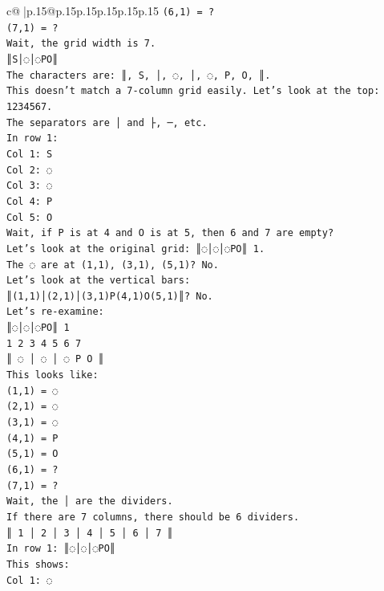 \documentclass{article}
\begin{document}
{\begin{supertabular}{c@{$\;$}|p{.15\linewidth}@{}p{.15\linewidth}p{.15\linewidth}p{.15\linewidth}p{.15\linewidth}p{.15\linewidth}}
{{{\texttt{(6,1) = ?} \\
\texttt{(7,1) = ?} \\
\texttt{Wait, the grid width is 7.} \\
\texttt{║S│◌│◌PO║} \\
\texttt{The characters are: ║, S, │, ◌, │, ◌, P, O, ║.} \\
\texttt{This doesn't match a 7{-}column grid easily. Let's look at the top: 1234567.} \\
\texttt{The separators are │ and ├, ─, etc.} \\
\texttt{In row 1:} \\
\texttt{Col 1: S} \\
\texttt{Col 2: ◌} \\
\texttt{Col 3: ◌} \\
\texttt{Col 4: P} \\
\texttt{Col 5: O} \\
\texttt{Wait, if P is at 4 and O is at 5, then 6 and 7 are empty?} \\
\texttt{Let's look at the original grid: ║◌│◌│◌PO║ 1.} \\
\texttt{The ◌ are at (1,1), (3,1), (5,1)? No.} \\
\texttt{Let's look at the vertical bars:} \\
\texttt{║(1,1)│(2,1)│(3,1)P(4,1)O(5,1)║? No.} \\
\texttt{Let's re{-}examine:} \\
\texttt{║◌│◌│◌PO║ 1} \\
\texttt{1 2 3 4 5 6 7} \\
\texttt{║ ◌ │ ◌ │ ◌ P O ║} \\
\texttt{This looks like:} \\
\texttt{(1,1) = ◌} \\
\texttt{(2,1) = ◌} \\
\texttt{(3,1) = ◌} \\
\texttt{(4,1) = P} \\
\texttt{(5,1) = O} \\
\texttt{(6,1) = ?} \\
\texttt{(7,1) = ?} \\
\texttt{Wait, the │ are the dividers.} \\
\texttt{If there are 7 columns, there should be 6 dividers.} \\
\texttt{║ 1 │ 2 │ 3 │ 4 │ 5 │ 6 │ 7 ║} \\
\texttt{In row 1: ║◌│◌│◌PO║} \\
\texttt{This shows:} \\
\texttt{Col 1: ◌} \\
}}}
\end{supertabular}}
\end{document}
